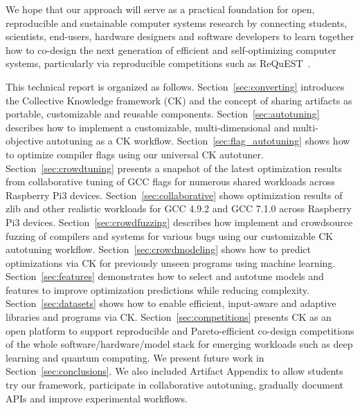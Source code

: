 We hope that our approach will serve as a practical foundation
for open, reproducible and sustainable computer systems research
by connecting students, scientists, end-users, hardware designers
and software developers to learn together how to co-design
the next generation of efficient and self-optimizing computer systems,
particularly via reproducible competitions such as ReQuEST~\cite{request}.
%

This technical report is organized as follows.
%
Section~\ref{sec:converting} introduces the Collective Knowledge framework (CK)
and the concept of sharing artifacts as portable, customizable and reusable components.
%
Section~\ref{sec:autotuning} describes how to implement a customizable,
multi-dimensional and multi-objective autotuning as a CK workflow.
%
Section~\ref{sec:flag_autotuning} shows how to optimize compiler flags using
our universal CK autotuner.
%
Section~\ref{sec:crowdtuning} presents a snapshot of the latest optimization
results from collaborative tuning of GCC flags for numerous shared workloads
across Raspberry Pi3 devices.
%
Section~\ref{sec:collaborative} shows optimization results of zlib and other
realistic workloads for GCC 4.9.2 and GCC 7.1.0 across Raspberry Pi3 devices.
%
Section~\ref{sec:crowdfuzzing} describes how implement and crowdsource fuzzing
of compilers and systems for various bugs using our customizable CK autotuning workflow.
%
Section~\ref{sec:crowdmodeling} shows how to predict optimizations via CK for previously
unseen programs using machine learning.
%
Section~\ref{sec:features} demonstrates how to select and autotune models
and features to improve optimization predictions while reducing complexity.
%
Section~\ref{sec:datasets} shows how to enable efficient, input-aware and adaptive 
libraries and programs via CK.
%
Section~\ref{sec:competitions} presents CK as an open platform to 
support reproducible and Pareto-efficient co-design competitions 
of the whole software/hardware/model stack for emerging workloads 
such as deep learning and quantum computing.
%
We present future work in Section~\ref{sec:conclusions}.
%
We also included Artifact Appendix to allow students try our framework, 
participate in collaborative autotuning, gradually document APIs and
improve experimental workflows.
